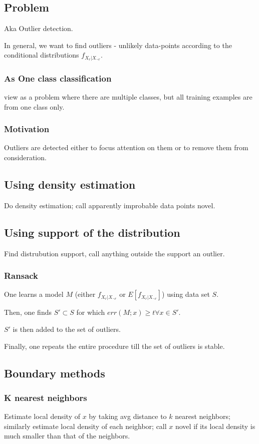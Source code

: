 \documentclass[oneside, article]{memoir}
\begin{document}
\subsection{Problem}
Aka Outlier detection.

In general, we want to find outliers - unlikely data-points according to the conditional distributions $f_{X_r|X_{\lnot r}}$.

\subsubsection{As One class classification}
view as a problem where there are multiple classes, but all training examples are from one class only.

\subsubsection{Motivation}
Outliers are detected either to focus attention on them or to remove them from consideration.

\subsection{Using density estimation}
Do density estimation; call apparently improbable data points novel.

\subsection{Using support of the distribution}
Find distrubution support, call anything outside the support an outlier.

\subsubsection{Ransack}
One learns a model $M$ (either $f_{X_r|X_{\lnot r}}$ or $E[f_{X_r|X_{\lnot r}}]$) using data set $S$.

Then, one finds $S' \subset S$ for which $err(M;x) \geq t \forall x \in S'$.

$S'$ is then added to the set of outliers. 

Finally, one repeats the entire procedure till the set of outliers is stable.

\subsection{Boundary methods}
\subsubsection{K nearest neighbors}
Estimate local density of $x$ by taking avg distance to $k$ nearest neighbors; similarly estimate local density of each neighbor; call $x$ novel if its local density is much smaller than that of the neighbors.
\end{document}

